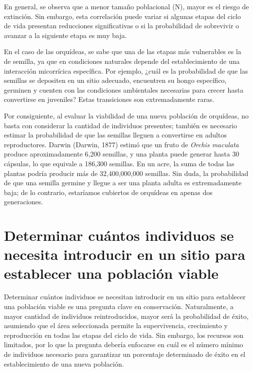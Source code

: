 \documentclass[
  12pt,
  letterpaper,
]{book}
\begin{document}
En general, se observa que a menor tamaño poblacional (N), mayor es el
riesgo de extinción. Sin embargo, esta correlación puede variar si
algunas etapas del ciclo de vida presentan reducciones significativas o
si la probabilidad de sobrevivir o avanzar a la siguiente etapa es muy
baja.

En el caso de las orquídeas, se sabe que una de las etapas más
vulnerables es la de semilla, ya que en condiciones naturales depende
del establecimiento de una interacción micorrícica específica. Por
ejemplo, ¿cuál es la probabilidad de que las semillas se depositen en un
sitio adecuado, encuentren su hongo específico, germinen y cuenten con
las condiciones ambientales necesarias para crecer hasta convertirse en
juveniles? Estas transiciones son extremadamente raras.

Por consiguiente, al evaluar la viabilidad de una nueva población de
orquídeas, no basta con considerar la cantidad de individuos presentes;
también es necesario estimar la probabilidad de que las semillas lleguen
a convertirse en adultos reproductores. Darwin (Darwin, 1877) estimó que
un fruto de \emph{Orchis maculata} produce aproximadamente 6,200
semillas, y una planta puede generar hasta 30 cápsulas, lo que equivale
a 186,300 semillas. En un acre, la suma de todas las plantas podría
producir más de 32,400,000,000 semillas. Sin duda, la probabilidad de
que una semilla germine y llegue a ser una planta adulta es
extremadamente baja; de lo contrario, estaríamos cubiertos de orquídeas
en apenas dos generaciones.

\section{Determinar cuántos individuos se necesita introducir en un
sitio para establecer una población
viable}\label{determinar-cuuxe1ntos-individuos-se-necesita-introducir-en-un-sitio-para-establecer-una-poblaciuxf3n-viable}

Determinar cuántos individuos se necesitan introducir en un sitio para
establecer una población viable es una pregunta clave en conservación.
Naturalmente, a mayor cantidad de individuos reintroducidos, mayor será
la probabilidad de éxito, asumiendo que el área seleccionada permite la
supervivencia, crecimiento y reproducción en todas las etapas del ciclo
de vida. Sin embargo, los recursos son limitados, por lo que la pregunta
debería enfocarse en cuál es el número mínimo de individuos necesario
para garantizar un porcentaje determinado de éxito en el establecimiento
de una nueva población.
\end{document}
